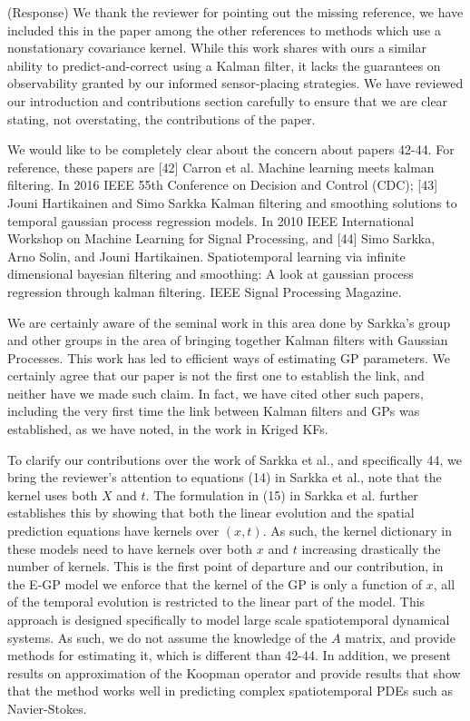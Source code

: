 \documentclass{letter}
\begin{document}
{\color{red}(Response)} We thank the reviewer for pointing out the missing reference, we have included this in the paper among the other references to methods which use a nonstationary covariance kernel. While this work shares with ours a similar ability to predict-and-correct using a Kalman filter, it lacks the guarantees on observability granted by our informed sensor-placing strategies. We have reviewed our introduction and contributions section carefully to ensure that we are clear stating, not overstating, the contributions of the paper.


We would like to be completely clear about the concern about papers 42-44. For reference, these papers are 
[42] Carron et al. Machine learning meets kalman filtering. In 2016 IEEE 55th Conference on Decision and Control (CDC);
[43] Jouni Hartikainen and Simo Sarkka Kalman filtering and smoothing solutions to temporal gaussian process regression models. In 2010 IEEE International Workshop on Machine
Learning for Signal Processing, and [44] Simo Sarkka, Arno Solin, and Jouni Hartikainen. Spatiotemporal learning via infinite dimensional bayesian filtering and smoothing: A look at gaussian process regression through kalman filtering. IEEE Signal Processing Magazine.

We are certainly aware of the seminal work in this area done by Sarkka's group and other groups in the area of bringing together Kalman filters with Gaussian Processes. This work has led to efficient ways of estimating GP parameters. We certainly agree that our paper is not the first one to establish the link, and neither have we made such claim. In fact, we have cited other such papers, including the very first time the link between Kalman filters and GPs was established, as we have noted, in the work in Kriged KFs.  

To clarify our contributions over  the work of Sarkka et al., and specifically 44, we bring the reviewer's attention to equations (14) in Sarkka et al., note that the kernel uses both $X$ and $t$. The formulation in (15) in Sarkka et al. further establishes this by showing that both the linear evolution and the spatial prediction equations have kernels over $(x,t)$. As such, the kernel dictionary in these models need to have kernels over both $x$ and $t$ increasing drastically the number of kernels. This is the first point of departure and our contribution, in the E-GP model we enforce that the kernel of the GP is only a function of $x$, all of the temporal evolution is restricted to the linear part of the model. This approach is designed specifically to model large scale spatiotemporal dynamical systems. As such, we do not assume the knowledge of the $A$ matrix, and provide methods for estimating it, which is different than 42-44. In addition, we present results on approximation of the Koopman operator and provide results that show that the method works well in predicting complex spatiotemporal PDEs such as Navier-Stokes.
\end{document}
